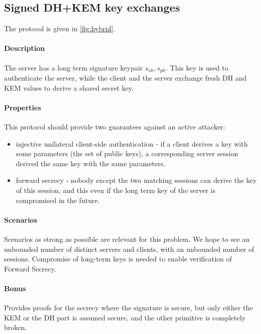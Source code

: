 \documentclass{article}
\newcommand{\sfsk}{\mathit{sk}}
\newcommand{\sfpk}{\mathit{pk}}
\begin{document}
\subsection{Signed DH+KEM key exchanges}\label{prob:hybrid}

The protocol is given in \cref{fig:hybrid}.

 \paragraph{Description} The server has a long term signature keypair $s_\sfsk,s_\sfpk$. 
This key is used to authenticate the server, while the client and the server exchange fresh DH and KEM values to derive a shared secret key.

\paragraph{Properties} This protocol should provide two guarantees against an active attacker:
\begin{itemize}
\item injective unilateral client-side authentication - if a client derives a key with some parameters (the set of public keys), a corresponding server session derived the same key with the same parameters.
\item forward secrecy - nobody except the two matching sessions can derive the key of this session, and this even if the long term key of the server is compromised in the future.
\end{itemize}

\paragraph{Scenarios} Scenarios as strong as possible are relevant for this problem. We hope to see an unbounded number of distinct servers and clients, with an unbounded number of sessions. Compromise of long-term keys is needed to enable verification of Forward Secrecy.  

\paragraph{Bonus} Provides proofs for the secrecy where the signature is secure, but only either the KEM or the DH part is assumed secure, and the other primitive is completely broken.
\end{document}
